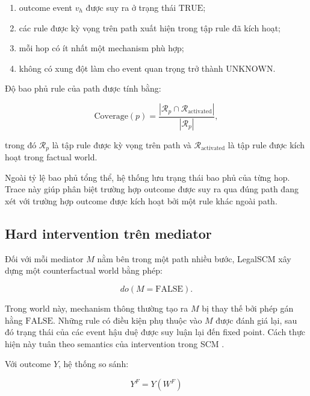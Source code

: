 \begin{enumerate}
    \item outcome event \(v_h\) được suy ra ở trạng thái
    \(\mathrm{TRUE}\);

    \item các rule được kỳ vọng trên path xuất hiện trong tập rule đã kích
    hoạt;

    \item mỗi hop có ít nhất một mechanism phù hợp;

    \item không có xung đột làm cho event quan trọng trở thành
    \(\mathrm{UNKNOWN}\).
\end{enumerate}

Độ bao phủ rule của path được tính bằng:

\begin{equation}
\mathrm{Coverage}(p)
=
\frac{
    \left|
        \mathcal{R}_{p}
        \cap
        \mathcal{R}_{\mathrm{activated}}
    \right|
}{
    \left|
        \mathcal{R}_{p}
    \right|
},
\end{equation}

trong đó \(\mathcal{R}_{p}\) là tập rule được kỳ vọng trên path và
\(\mathcal{R}_{\mathrm{activated}}\) là tập rule được kích hoạt trong factual
world.

Ngoài tỷ lệ bao phủ tổng thể, hệ thống lưu trạng thái bao phủ của từng hop.
Trace này giúp phân biệt trường hợp outcome được suy ra qua đúng path đang
xét với trường hợp outcome được kích hoạt bởi một rule khác ngoài path.

\subsection{Hard intervention trên mediator}

Đối với mỗi mediator \(M\) nằm bên trong một path nhiều bước, LegalSCM xây
dựng một counterfactual world bằng phép:

\[
do
\left(
    M=\mathrm{FALSE}
\right).
\]

Trong world này, mechanism thông thường tạo ra \(M\) bị thay thế bởi phép
gán hằng \(\mathrm{FALSE}\). Những rule có điều kiện phụ thuộc vào \(M\) được
đánh giá lại, sau đó trạng thái của các event hậu duệ được suy luận lại đến
fixed point. Cách thực hiện này tuân theo semantics của intervention trong
SCM \cite{pearl2009causality}.

Với outcome \(Y\), hệ thống so sánh:

\[
Y^{F}
=
Y
\left(
W^{F}
\right)
\]

